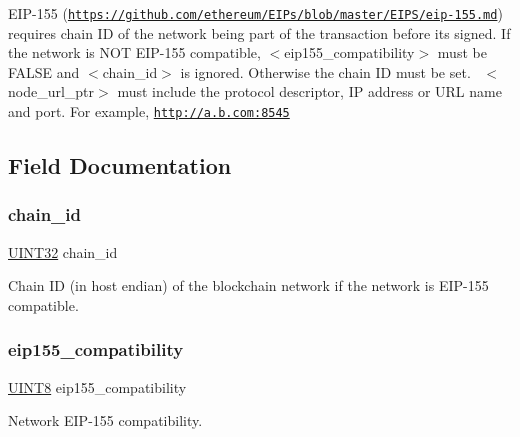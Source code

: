 E\+I\+P-\/155 (\href{https://github.com/ethereum/EIPs/blob/master/EIPS/eip-155.md}{\tt https\+://github.\+com/ethereum/\+E\+I\+Ps/blob/master/\+E\+I\+P\+S/eip-\/155.\+md}) requires chain ID of the network being part of the transaction before it\textquotesingle{}s signed. If the network is N\+OT E\+I\+P-\/155 compatible, $<$eip155\+\_\+compatibility$>$ must be F\+A\+L\+SE and $<$chain\+\_\+id$>$ is ignored. Otherwise the chain ID must be set.~\newline
$<$node\+\_\+url\+\_\+ptr$>$ must include the protocol descriptor, IP address or U\+RL name and port. For example, \href{http://a.b.com:8545}{\tt http\+://a.\+b.\+com\+:8545} 

\subsection{Field Documentation}
\mbox{\label{struct_t_network_info_a01b042ef5fc9d24a77755f82ac8a75eb}} 
\subsubsection{\texorpdfstring{chain\+\_\+id}{chain\_id}}
{\footnotesize\ttfamily \mbox{\hyperlink{boattypes_8h_ae1e6edbbc26d6fbc71a90190d0266018}{U\+I\+N\+T32}} chain\+\_\+id}



Chain ID (in host endian) of the blockchain network if the network is E\+I\+P-\/155 compatible. 

\mbox{\label{struct_t_network_info_acc303011417574fe14d58783e3a36348}} 
\subsubsection{\texorpdfstring{eip155\+\_\+compatibility}{eip155\_compatibility}}
{\footnotesize\ttfamily \mbox{\hyperlink{boattypes_8h_ab27e9918b538ce9d8ca692479b375b6a}{U\+I\+N\+T8}} eip155\+\_\+compatibility}



Network E\+I\+P-\/155 compatibility. 

